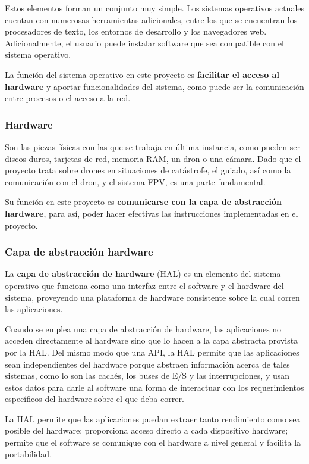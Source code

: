 Estos elementos forman un conjunto muy simple. Los sistemas operativos actuales cuentan con numerosas herramientas adicionales, entre los que se encuentran los procesadores de texto, los entornos de desarrollo y los navegadores web. Adicionalmente, el usuario puede instalar software que sea compatible con el sistema operativo.

La función del sistema operativo en este proyecto es \textbf{facilitar el acceso al hardware} y aportar funcionalidades del sistema, como puede ser la comunicación entre procesos o el acceso a la red.

\subsubsection{Hardware}
\label{sec:hardwarearq}

Son las piezas físicas con las que se trabaja en última instancia, como pueden ser discos duros, tarjetas de red, memoria RAM, un dron o una cámara. Dado que el proyecto trata sobre drones en situaciones de catástrofe, el guiado, así como la comunicación con el dron, y el sistema \acs{FPV}, es una parte fundamental.

Su función en este proyecto es \textbf{comunicarse con la capa de abstracción hardware}, para así, poder hacer efectivas las instrucciones implementadas en el proyecto.

\subsubsection{Capa de abstracción hardware}
\label{sec:hardwareabs}

La \textbf{capa de abstracción de hardware} (\acs{HAL}) es un elemento del sistema operativo que funciona como una interfaz entre el software y el hardware del sistema, proveyendo una plataforma de hardware consistente sobre la cual corren las aplicaciones. 

Cuando se emplea una capa de abstracción de hardware, las aplicaciones no acceden directamente al hardware sino que lo hacen a la capa abstracta provista por la \acs{HAL}. Del mismo modo que una \acs{API}, la HAL permite que las aplicaciones sean independientes del hardware porque abstraen información acerca de tales sistemas, como lo son las cachés, los buses de E/S y las interrupciones, y usan estos datos para darle al software una forma de interactuar con los requerimientos específicos del hardware sobre el que deba correr.

La \acs{HAL} permite que las aplicaciones puedan extraer tanto rendimiento como sea posible del hardware; proporciona acceso directo a cada dispositivo hardware; permite que el software se comunique con el hardware a nivel general y facilita la portabilidad.

